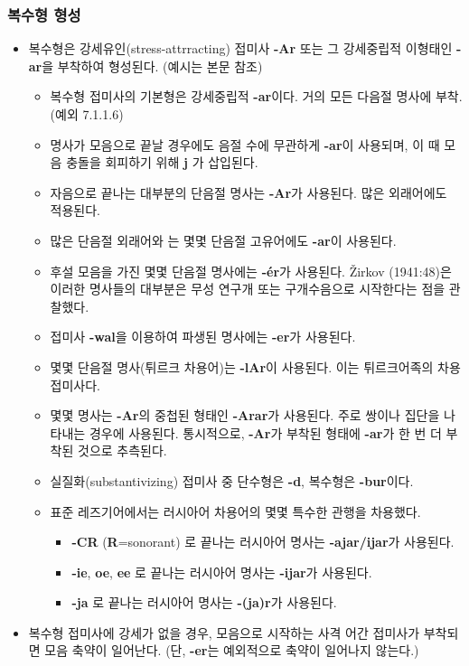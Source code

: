 \subsubsection{복수형 형성}
\begin{itemize}
\item 복수형은 강세유인(stress-attrracting) 접미사 \textbf{-Ar} 또는 그 강세중립적 이형태인 \textbf{-ar}을 부착하여 형성된다. (예시는 본문 참조)
\begin{itemize}
\item 복수형 접미사의 기본형은 강세중립적 \textbf{-ar}이다. 거의 모든 다음절 명사에 부착. (예외 7.1.1.6)
\item 명사가 모음으로 끝날 경우에도 음절 수에 무관하게 \textbf{-ar}이 사용되며, 이 때 모음 충돌을 회피하기 위해 \textbf{j} 가 삽입된다.
\item 자음으로 끝나는 대부분의 단음절 명사는 \textbf{-Ar}가 사용된다. 많은 외래어에도 적용된다. 
\item 많은 단음절 외래어와 는 몇몇 단음절 고유어에도 \textbf{-ar}이 사용된다.
\item 후설 모음을 가진 몇몇 단음절 명사에는 \textbf{-ér}가 사용된다. Žirkov (1941:48)은 이러한 명사들의 대부분은 무성 연구개 또는 구개수음으로 시작한다는 점을 관찰했다.
\item 접미사 \textbf{-wal}을 이용하여 파생된 명사에는 \textbf{-er}가 사용된다.
\item 몇몇 단음절 명사(튀르크 차용어)는 \textbf{-lAr}이 사용된다. 이는 튀르크어족의 차용 접미사다.
\item 몇몇 명사는 \textbf{-Ar}의 중첩된 형태인 \textbf{-Arar}가 사용된다. 주로 쌍이나 집단을 나타내는 경우에 사용된다. 통시적으로, \textbf{-Ar}가 부착된 형태에 \textbf{-ar}가 한 번 더 부착된 것으로 추측된다.
\item 실질화(substantivizing) 접미사 중 단수형은 \textbf{-d}, 복수형은 \textbf{-bur}이다.
\item 표준 레즈기어에서는 러시아어 차용어의 몇몇 특수한 관행을 차용했다. 
\begin{itemize}
\item \textbf{-CR} (\textbf{R}=sonorant) 로 끝나는 러시아어 명사는 \textbf{-ajar/ijar}가 사용된다.
\item \textbf{-ie}, \textbf{oe}, \textbf{ee} 로 끝나는 러시아어 명사는 \textbf{-ijar}가 사용된다.
\item \textbf{-ja} 로 끝나는 러시아어 명사는 \textbf{-(ja)r}가 사용된다.
\end{itemize}
\end{itemize}
\item 복수형 접미사에 강세가 없을 경우, 모음으로 시작하는 사격 어간 접미사가 부착되면 모음 축약이 일어난다. (단, \textbf{-er}는 예외적으로 축약이 일어나지 않는다.)
\end{itemize}

